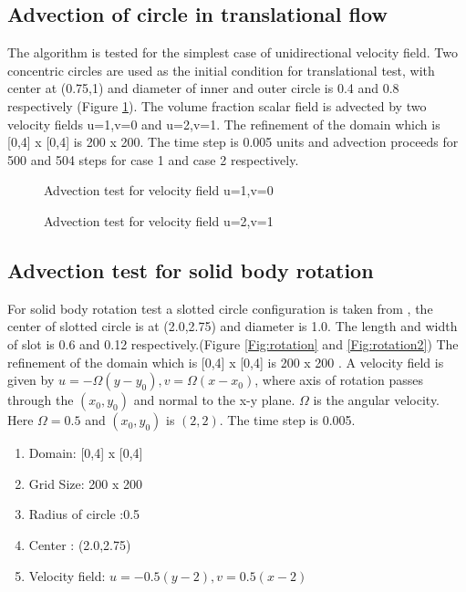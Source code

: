\subsection{Advection of circle in translational flow}
The algorithm is tested for the simplest case of unidirectional velocity field. Two concentric circles are used as the initial 
condition for translational test, with center at (0.75,1) and diameter of inner and outer circle is 0.4 and 0.8 respectively (Figure \ref{Fig:translational_test}).
The volume fraction scalar field is advected by two velocity fields u=1,v=0 and u=2,v=1. The refinement of the domain which is [0,4] x [0,4] is 200 x 200. The time
step is 0.005 units and advection proceeds for 500 and 504 steps for case 1 and case 2 respectively.

\begin{figure}%
 \centering
 \caption{Advection test for velocity field u=1,v=0}
 \label{Fig:translational_test}
\end{figure}

\begin{figure}%
 \centering
 \caption{Advection test for velocity field u=2,v=1}
\end{figure}

\subsection{Advection test for solid body rotation}
For solid body rotation test a slotted circle configuration is taken from \cite{Zalesak1979}, the center of slotted circle is at
(2.0,2.75) and diameter is 1.0. The length and width of slot is 0.6 and 0.12 respectively.(Figure \ref{Fig:rotation} and \ref{Fig:rotation2})  
The refinement of the domain which is [0,4] x [0,4] is 200 x 200 . A velocity field is given by $u=-\Omega(y-y_0),v=\Omega(x-x_0)$, 
where axis of rotation passes through the $(x_0,y_0)$ and normal to the x-y plane. $\Omega$ is the angular velocity. 
Here $\Omega = 0.5$ and $(x_0,y_0)$ is $(2,2)$. The time step is 0.005.
\begin{enumerate}
 \item Domain: [0,4] x [0,4]
 \item Grid Size: 200 x 200
 \item Radius of circle :0.5
 \item Center : (2.0,2.75)
 \item Velocity field:  $u=-0.5(y-2),v=0.5(x-2)$
\end{enumerate}

